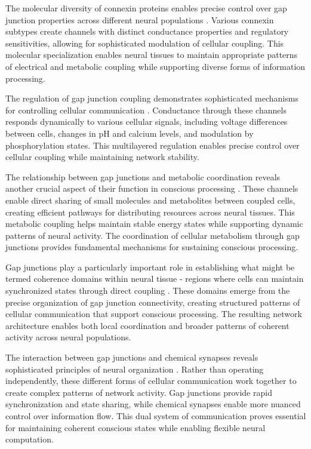 The molecular diversity of connexin proteins enables precise control over gap junction properties across different neural populations \cite{Willecke2002}. Various connexin subtypes create channels with distinct conductance properties and regulatory sensitivities, allowing for sophisticated modulation of cellular coupling. This molecular specialization enables neural tissues to maintain appropriate patterns of electrical and metabolic coupling while supporting diverse forms of information processing.

The regulation of gap junction coupling demonstrates sophisticated mechanisms for controlling cellular communication \cite{Nagy2018}. Conductance through these channels responds dynamically to various cellular signals, including voltage differences between cells, changes in pH and calcium levels, and modulation by phosphorylation states. This multilayered regulation enables precise control over cellular coupling while maintaining network stability.

The relationship between gap junctions and metabolic coordination reveals another crucial aspect of their function in conscious processing \cite{Hormuzdi2004}. These channels enable direct sharing of small molecules and metabolites between coupled cells, creating efficient pathways for distributing resources across neural tissues. This metabolic coupling helps maintain stable energy states while supporting dynamic patterns of neural activity. The coordination of cellular metabolism through gap junctions provides fundamental mechanisms for sustaining conscious processing.

Gap junctions play a particularly important role in establishing what might be termed coherence domains within neural tissue - regions where cells can maintain synchronized states through direct coupling \cite{Pannasch2013}. These domains emerge from the precise organization of gap junction connectivity, creating structured patterns of cellular communication that support conscious processing. The resulting network architecture enables both local coordination and broader patterns of coherent activity across neural populations.

The interaction between gap junctions and chemical synapses reveals sophisticated principles of neural organization \cite{Pereda2014}. Rather than operating independently, these different forms of cellular communication work together to create complex patterns of network activity. Gap junctions provide rapid synchronization and state sharing, while chemical synapses enable more nuanced control over information flow. This dual system of communication proves essential for maintaining coherent conscious states while enabling flexible neural computation.

